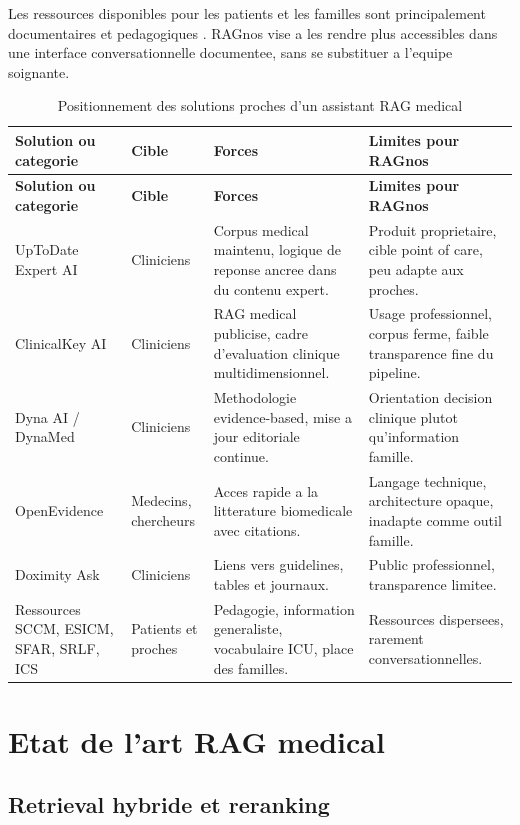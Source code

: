 \documentclass[11pt,a4paper]{article}
\begin{document}
Les ressources disponibles pour les patients et les familles sont principalement documentaires et pedagogiques \autocite{sccmPatientFamilyResources,esicmPatientFamily,icsPatientResources,sfarInfoPatientsRea,srlfVisitesProches}. RAGnos vise a les rendre plus accessibles dans une interface conversationnelle documentee, sans se substituer a l'equipe soignante.

\begin{longtable}{p{2.7cm}p{2.9cm}p{3.8cm}p{3.7cm}}
\caption{Positionnement des solutions proches d'un assistant RAG medical}\\
\toprule
\textbf{Solution ou categorie} & \textbf{Cible} & \textbf{Forces} & \textbf{Limites pour RAGnos}\\
\midrule
\endfirsthead
\toprule
\textbf{Solution ou categorie} & \textbf{Cible} & \textbf{Forces} & \textbf{Limites pour RAGnos}\\
\midrule
\endhead
UpToDate Expert AI & Cliniciens & Corpus medical maintenu, logique de reponse ancree dans du contenu expert. & Produit proprietaire, cible point of care, peu adapte aux proches. \\
ClinicalKey AI & Cliniciens & RAG medical publicise, cadre d'evaluation clinique multidimensionnel. & Usage professionnel, corpus ferme, faible transparence fine du pipeline. \\
Dyna AI / DynaMed & Cliniciens & Methodologie evidence-based, mise a jour editoriale continue. & Orientation decision clinique plutot qu'information famille. \\
OpenEvidence & Medecins, chercheurs & Acces rapide a la litterature biomedicale avec citations. & Langage technique, architecture opaque, inadapte comme outil famille. \\
Doximity Ask & Cliniciens & Liens vers guidelines, tables et journaux. & Public professionnel, transparence limitee. \\
Ressources SCCM, ESICM, SFAR, SRLF, ICS & Patients et proches & Pedagogie, information generaliste, vocabulaire ICU, place des familles. & Ressources dispersees, rarement conversationnelles. \\
\bottomrule
\end{longtable}

\section{Etat de l'art RAG medical}

\subsection{Retrieval hybride et reranking}
\end{document}
